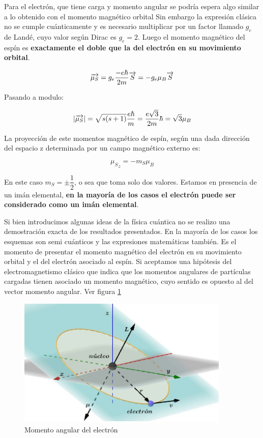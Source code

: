 Para el electrón, que tiene carga y momento angular se podría espera algo similar a lo obtenido con el momento magnético orbital Sin embargo la expresión clásica no se cumple cuánticamente y es necesario multiplicar por un factor llamado $g_{e}$  de Landé, cuyo valor según Dirac es $g_{e}=2$. Luego el momento magnético del espín es \textbf{exactamente el doble que la del electrón en su movimiento orbital}.

\begin{equation}
	\overrightarrow{\mu_{S}} = g_{e} \dfrac{-e\hbar}{2m}\overrightarrow{S} = -g_{e}\mu_{B}\overrightarrow{S}
\end{equation}

Pasando a modulo:

\begin{equation}
	\vert\overrightarrow{\mu_{S}}\vert = \sqrt{s(s+1)} \dfrac{e\hbar}{m} = \dfrac{e\sqrt{3}}{2m} \hbar = \sqrt{3} \mu_{B}
\end{equation}

La proyección de este momentos magnético de espín, según una dada dirección del espacio z determinada por un campo magnético externo es:

\begin{equation}
	{\mu_{S}}_{z} = -m_{S} \mu_{B}
\end{equation}

En este caso $m_{S}=\pm \dfrac{1}{2}$, o sea que toma solo dos valores. Estamos en presencia de un imán elemental, \textbf{en la mayoría de los casos el electrón puede ser considerado como un imán elemental}.

Si bien introducimos algunas ideas de la física cuántica no se realizo una demostración exacta de los resultados presentados. En la mayoría de los casos los esquemas son semi cuánticos y las expresiones matemáticas también. Es el momento de presentar el momento magnético del electrón en su movimiento orbital y el del electrón asociado al espín. Si aceptamos una hipótesis del electromagnetismo clásico que indica que los momentos angulares de partículas cargadas tienen asociado un momento magnético, cuyo sentido es opuesto al del vector momento angular. Ver figura \ref{fig:113}

\begin{figure}[H]
    \centering
    \includegraphics[width=0.9\textwidth]{./Figures/fig113}
	\caption{Momento angular del electrón}
	\label{fig:113}
 \end{figure}

